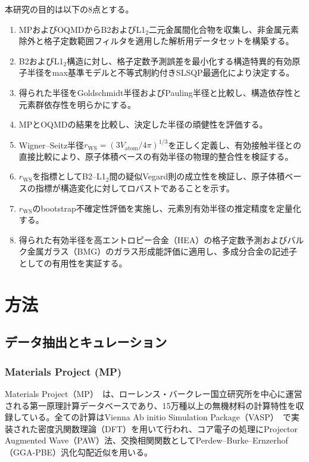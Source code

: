 \documentclass[a4paper,10pt,5p]{elsarticle}
\begin{document}
本研究の目的は以下の8点とする。
\begin{enumerate}
\setlength{\parskip}{0cm}
\setlength{\itemsep}{0cm}
    \item MPおよびOQMDからB2およびL1$_2$二元金属間化合物を収集し、非金属元素除外と格子定数範囲フィルタを適用した解析用データセットを構築する。
    \item B2およびL1$_2$構造に対し、格子定数予測誤差を最小化する構造特異的有効原子半径をmax基準モデルと不等式制約付きSLSQP最適化により決定する。
    \item 得られた半径をGoldschmidt半径およびPauling半径と比較し、構造依存性と元素群依存性を明らかにする。
    \item MPとOQMDの結果を比較し、決定した半径の頑健性を評価する。
    \item Wigner--Seitz半径$r_\mathrm{WS} = (3V_\mathrm{atom}/4\pi)^{1/3}$を正しく定義し、有効接触半径との直接比較により、原子体積ベースの有効半径の物理的整合性を検証する。
    \item $r_\mathrm{WS}$を指標としてB2--L1$_2$間の疑似Vegard則の成立性を検証し、原子体積ベースの指標が構造変化に対してロバストであることを示す。
    \item $r_\mathrm{WS}$のbootstrap不確定性評価を実施し、元素別有効半径の推定精度を定量化する。
    \item 得られた有効半径を高エントロピー合金（HEA）の格子定数予測およびバルク金属ガラス（BMG）のガラス形成能評価に適用し、多成分合金の記述子としての有用性を実証する。
\end{enumerate}


\section{方法}

\subsection{データ抽出とキュレーション}

\subsubsection{Materials Project (MP)}
Materials Project（MP）~\cite{jain2013}は、ローレンス・バークレー国立研究所を中心に運営される第一原理計算データベースであり、15万種以上の無機材料の計算特性を収録している。全ての計算はVienna Ab initio Simulation Package（VASP）~\cite{kresse1996}で実装された密度汎関数理論（DFT）を用いて行われ、コア電子の処理にProjector Augmented Wave（PAW）法、交換相関関数としてPerdew--Burke--Ernzerhof（GGA-PBE）汎化勾配近似を用いる。
\end{document}
